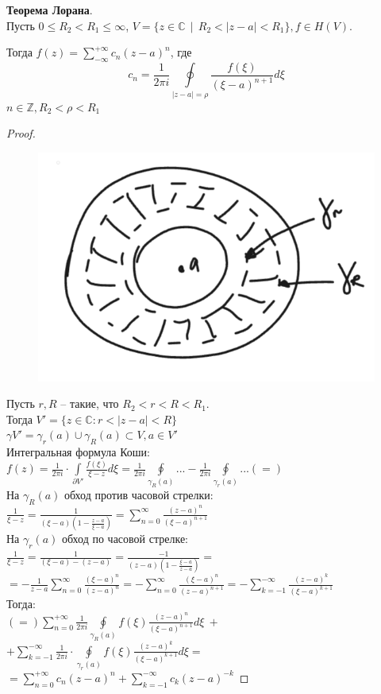 \textbf{Теорема Лорана}.\\[2mm]
Пусть $0\le R_2 < R_1 \le \infty$, $V = \{z\in\mathbb{C} ~~|~~ R_2 < |z - a| < R_1\}, f\in H(V)$.

Тогда $f(z) = \sum\limits_{-\infty}^{+\infty}c_n (z - a)^n$, где
$$
c_n = \frac{1}{2\pi i}\oint\limits_{|z - a| = \rho} \frac{f(\xi)}{(\xi - a)^{n + 1}} d\xi
$$
$n\in\mathbb{Z}, R_2 < \rho < R_1$

\begin{proof}
    \ \\
    
    \begin{figure}[h]
        \centering
        \includegraphics[width=0.4\linewidth]{answers/img/ans14.png}
    \end{figure}
    Пусть $r, R$ -- такие, что $R_2<r<R<R_1$.\\
    Тогда $V'=\{z\in \mathbb{C}: r<|z-a|<R\}$\\
    $\gamma V'=\gamma_r(a)\cup \gamma_R(a)\subset V, a\in V'$\\
    Интегральная формула Коши: $f(z)=\frac{1}{2\pi i}\cdot \int\limits_{\partial V'}\frac{f(\xi)}{\xi-z}d\xi = \frac{1}{2\pi i}\oint\limits_{\gamma_R(a)}...-\frac{1}{2\pi i}\oint\limits_{\gamma_r(a)}... (=)$\\
    На $\gamma_R(a)$ обход против часовой стрелки:\\
    $\frac{1}{\xi-z}=\frac{1}{(\xi-a)(1-\frac{z-a}{\xi-a})}=\sum_{n=0}^\infty \frac{(z-a)^n}{(\xi-a)^{n+1}}$\\ 
    На $\gamma_r(a)$ обход по часовой стрелке:\\ 
    $\frac{1}{\xi - z} = \frac{1}{(\xi-a)-(z-a)}=\frac{-1}{(z-a)(1-\frac{\xi-a}{z-a})}=$ \\
    $=-\frac{1}{z-a}\sum_{n=0}^\infty \frac{(\xi-a)^n}{(z-a)^n}=-\sum_{n=0}^\infty \frac{(\xi-a)^n}{(z-a)^{n+1}} = -\sum_{k=-1}^{-\infty} \frac{(z-a)^k}{(\xi-a)^{k+1}}$\\
    Тогда:\\
    $(=) \sum_{n=0}^{+\infty} \frac{1}{2\pi i} \oint\limits_{\gamma_R(a)}f(\xi) \frac{(z-a)^n}{(\xi-a)^{n+1}}d\xi \ +$\\
    $+\sum_{k=-1}^{-\infty}\frac{1}{2\pi i}\cdot \oint\limits_{\gamma_r(a)}f(\xi)\frac{(z-a)^k}{(\xi-a)^{k+1}}d\xi=$ \\
    $= \sum\limits_{n=0}^{+\infty} c_n(z-a)^n+\sum_{k=-1}^{-\infty}c_k(z-a)^{-k}$ 
    
\end{proof}

